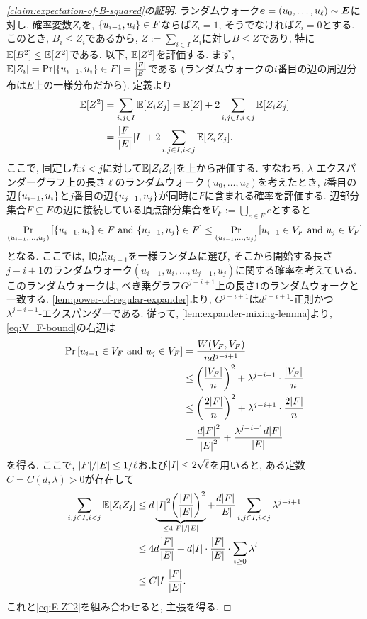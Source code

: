 \begin{proof}[\cref{claim:expectation-of-B-squared}の証明]
  ランダムウォーク$\boldsymbol{e}=(u_0,\dots,u_\ell)\sim\boldsymbol{E}$に対し, 確率変数$Z_i$を, $\qty{u_{i-1},u_i}\in F$ならば$Z_i=1$, そうでなければ$Z_i=0$とする.
  このとき, $B_i\le Z_i$であるから, $Z:=\sum_{i\in I} Z_i$に対し$B\le Z$であり, 特に$\operatorname*{\mathbb{E}}[B^2]\le \operatorname*{\mathbb{E}}[Z^2]$である.
  以下, $\operatorname*{\mathbb{E}}[Z^2]$を評価する. まず, $\operatorname*{\mathbb{E}}[Z_i]=\Pr[\qty{u_{i-1},u_i}\in F]=\frac{\abs{F}}{\abs{E}}$である (ランダムウォークの$i$番目の辺の周辺分布は$E$上の一様分布だから).
  定義より
  \begin{align}
    \operatorname*{\mathbb{E}}[Z^2] &= \sum_{i,j\in I} \operatorname*{\mathbb{E}}[Z_i Z_j] = \operatorname*{\mathbb{E}}[Z] + 2 \sum_{i,j\in I,i<j} \operatorname*{\mathbb{E}}[Z_i Z_j] \nonumber \\
    &= \frac{\abs{F}}{\abs{E}} \abs{I} + 2 \sum_{i,j\in I,i<j} \operatorname*{\mathbb{E}}[Z_iZ_j]. \label{eq:E-Z^2}
  \end{align}
  ここで, 固定した$i<j$に対して$\operatorname*{\mathbb{E}}[Z_iZ_j]$を上から評価する.
  すなわち, $\lambda$-エクスパンダーグラフ上の長さ$\ell$のランダムウォーク$(u_0,\dots,u_\ell)$を考えたとき, $i$番目の辺$\qty{u_{i-1},u_i}$と$j$番目の辺$\qty{u_{j-1},u_j}$が同時に$F$に含まれる確率を評価する.
  辺部分集合$F\subseteq E$の辺に接続している頂点部分集合を$V_F:=\bigcup_{e\in F} e$とすると
  \begin{align}
    \Pr_{(u_{i-1},\dots,u_j)}\qty[\qty{u_{i-1},u_i}\in F \text{ and } \qty{u_{j-1},u_j}\in F] \le \Pr_{(u_{i-1},\dots,u_j)}\qty[u_{i-1}\in V_F\text{ and }u_j\in V_F] \label{eq:V_F-bound}
  \end{align}
  となる. ここでは, 頂点$u_{i-1}$を一様ランダムに選び, そこから開始する長さ$j-i+1$のランダムウォーク$(u_{i-1},u_i,\dots,u_{j-1},u_j)$に関する確率を考えている.
  このランダムウォークは, べき乗グラフ$G^{j-i+1}$上の長さ$1$のランダムウォークと一致する.
  \cref{lem:power-of-regular-expander}より, $G^{j-i+1}$は$d^{j-i+1}$-正則かつ$\lambda^{j-i+1}$-エクスパンダーである.
  従って, \cref{lem:expander-mixing-lemma}より, \cref{eq:V_F-bound}の右辺は
  \begin{align*}
    \Pr\qty[u_{i-1}\in V_F\text{ and }u_j\in V_F] &= \frac{W(V_F,V_F)}{nd^{j-i+1}} \\
    &\le \qty(\frac{\abs{V_F}}{n})^2 + \lambda^{j-i+1} \cdot \frac{\abs{V_F}}{n} \\
    &\le \qty(\frac{2\abs{F}}{n})^2 + \lambda^{j-i+1} \cdot \frac{2\abs{F}}{n} \\
    &= \frac{d\abs{F}^2}{\abs{E}^2} + \frac{\lambda^{j-i+1}d\abs{F}}{\abs{E}}
  \end{align*}
  を得る. ここで,
  $\abs{F}/\abs{E} \le 1/\ell$および$\abs{I} \le 2\sqrt{\ell}$を用いると,
  ある定数$C=C(d,\lambda)>0$が存在して
  \begin{align*}
    \sum_{i,j\in I,i<j} \operatorname*{\mathbb{E}}[Z_iZ_j] &\le d\underbrace{\abs{I}^2 \qty(\frac{\abs{F}}{\abs{E}})^2}_{\le 4\abs{F}/\abs{E}} + \frac{d\abs{F}}{\abs{E}} \sum_{i,j\in I,i<j} \lambda^{j-i+1} \\
    &\le 4d \frac{\abs{F}}{\abs{E}} + d\abs{I}\cdot \frac{\abs{F}}{\abs{E}} \cdot \sum_{i\ge 0} \lambda^i \\
    &\le C\abs{I}\frac{\abs{F}}{\abs{E}}.
  \end{align*}
  これと\cref{eq:E-Z^2}を組み合わせると, 主張を得る.
\end{proof}

